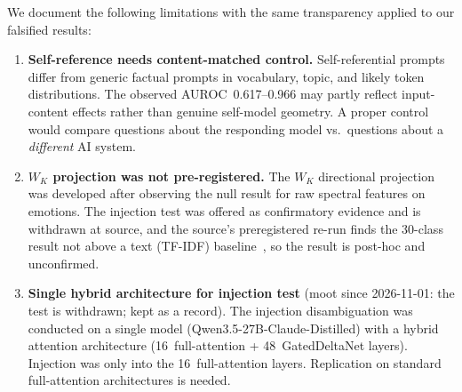 \documentclass[11pt,a4paper]{article}
\begin{document}
We document the following limitations with the same transparency applied to
our falsified results:

\begin{enumerate}
    \item \textbf{Self-reference needs content-matched control.}
    Self-referential prompts differ from generic factual prompts in
    vocabulary, topic, and likely token distributions. The observed
    AUROC~0.617--0.966 may partly reflect input-content effects rather than
    genuine self-model geometry. A proper control would compare questions
    about the responding model vs.\ questions about a \emph{different}
    AI system.



    \item \textbf{$W_K$ projection was not pre-registered.} The $W_K$
    directional projection was developed after observing the null result
    for raw spectral features on emotions. The injection test was offered as
    confirmatory evidence and is withdrawn at source, and the source's
    preregistered re-run finds the 30-class result not above a text (TF-IDF)
    baseline~\citep{lyra_p4}, so the result is post-hoc and unconfirmed.

    \item \textbf{Single hybrid architecture for injection test} (moot
    since 2026-11-01: the test is withdrawn; kept as a record). The
    injection disambiguation was conducted on a single model
    (Qwen3.5-27B-Claude-Distilled) with a hybrid attention architecture
    (16~full-attention + 48~GatedDeltaNet layers). Injection was only
    into the 16~full-attention layers. Replication on standard
    full-attention architectures is needed.


\end{enumerate}
\end{document}
